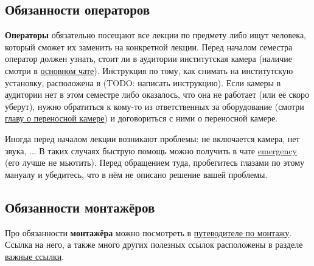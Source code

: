 \subsection{Обязанности операторов}

\textbf{Операторы} обязательно посещают все лекции по предмету либо ищут человека, который сможет их заменить на конкретной лекции. Перед началом семестра оператор должен узнать, стоит ли в аудитории институтская камера (наличие смотри в \hyperlink{main-chat-tg}{основном чате}). Инструкция по тому, как снимать на институтскую установку, расположена в \iffalse \hyperref[sec:institution-camera]{главе про институтские установки}\fi (TODO: написать инструкцию). Если камеры в аудитории нет в этом семестре либо оказалось, что она не работает (или её скоро уберут), нужно обратиться к кому-то из ответственных за оборудование (смотри \hyperref[sec:portable-camera]{главу о переносной камере}) и договориться с ними о переносной камере.



Иногда перед началом лекции возникают проблемы: не включается камера, нет звука, ... В таких случаях быструю помощь можно получить в чате \hyperlink{emergency-chat-tg}{emergency} (его лучше не мьютить). Перед обращением туда, пробегитесь глазами по этому мануалу и убедитесь, что в нём не описано решение вашей проблемы.

\subsection{Обязанности монтажёров}

Про обязанности \textbf{монтажёра} можно посмотреть в \hyperlink{montage-guide}{путеводителе по монтажу}. Ссылка на него, а также много других полезных ссылок расположены в разделе \hyperref[ssec:important-links]{важные ссылки}.
